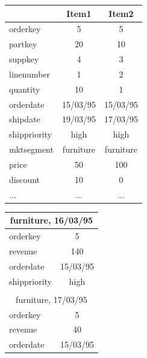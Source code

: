 \documentclass[sigconf, nonacm]{acmart}
\begin{document}
\begin{table}
	\small
	\setlength\tabcolsep{5pt}
	\begin{minipage}{0.26\textwidth}
	\begin{tabular}{lcc}
		\multicolumn{1}{c}{}               & Item1                          & Item2                          \\ \hline
		orderkey     & 5         & 5         \\
		partkey      & 20        & 10        \\
		suppkey      & 4         & 3         \\
		linenumber   & 1         & 2         \\
		quantity     & 10        & 1         \\
		orderdate    & 15/03/95  & 15/03/95  \\
		shipdate     & 19/03/95  & 17/03/95  \\
		shippriority & high      & high      \\
		mktsegment   & furniture & furniture \\
		price        & 50        & 100       \\
		discount     & 10        & 0         \\
		...          & ...       & ...       \\ \hline
	\end{tabular}
		\vspace{1em}
		\label{table:new_lineitems}
	\end{minipage}
	\begin{minipage}{0.2\textwidth}
	\begin{tabular}{lc}
		\multicolumn{2}{c}{furniture, 16/03/95}                            \\ \hline
		orderkey     & 5        \\
		revenue      & 140      \\
		orderdate    & 15/03/95 \\
		shippriority & high     \\ \hline
		{} & {} \vspace*{-0.4em}    \\ 
		\multicolumn{2}{c}{furniture, 17/03/95}                            \\ \hline
		orderkey     & 5        \\
		revenue      & 40       \\
		orderdate    & 15/03/95 \\

\end{tabular}
\end{minipage}
\end{table}
\end{document}

